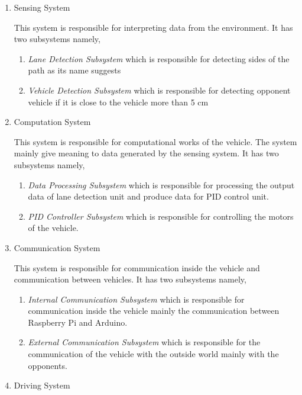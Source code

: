 \documentclass[a4paper,12pt]{article}
\begin{document}
	\begin{enumerate}
		\item Sensing System
			
			This system is responsible for interpreting data from the environment. It has two subsystems namely,
			
			\begin{enumerate}
				\item \textit{Lane Detection Subsystem} which is responsible for detecting sides of the path as its name suggests
				\item \textit{Vehicle Detection Subsystem} which is responsible for detecting opponent vehicle if it is close to the vehicle more than 5 cm
			\end{enumerate}
		
		\item Computation System
		
			This system is responsible for computational works of the vehicle. The system mainly give meaning to data generated by the sensing system. It has two subsystems namely,
			
			\begin{enumerate}
				\item \textit{Data Processing Subsystem} which is responsible for processing the output data of lane detection unit and produce data for PID control unit.
				\item \textit{PID Controller Subsystem} which is responsible for controlling the motors of the vehicle.
			\end{enumerate}
			
		\item Communication System	
		
		This system is responsible for communication inside the vehicle and communication between vehicles. It has two subsystems namely,
			
			\begin{enumerate}
				\item \textit{Internal Communication Subsystem} which is responsible for communication inside the vehicle mainly the communication between Raspberry Pi and Arduino.						\item \textit{External Communication Subsystem} which is responsible for the communication of the vehicle with the outside world mainly with the opponents.
			\end{enumerate}
		
		\item Driving System
		

\end{enumerate}
\end{document}
